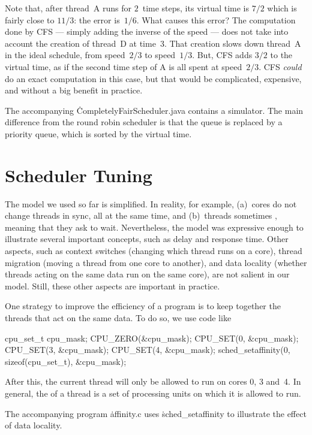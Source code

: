 Note that, after thread~A runs for $2$~time steps,
  its virtual time is $7/2$ which is fairly close to $11/3$:
  the error is~$1/6$.
What causes this error?
The computation done by CFS --- simply adding the inverse of the speed ---
  does not take into account the creation of thread~D at time~$3$.
That creation slows down thread~A in the ideal schedule,
  from speed~$2/3$ to speed~$1/3$.
But, CFS adds $3/2$ to the virtual time,
  as if the second time step of A is all spent at speed~$2/3$.
CFS \emph{could} do an exact computation in this case,
  but that would be complicated, expensive, and without a big benefit in practice.

The accompanying \.{CompletelyFairScheduler.java} contains a simulator.
The main difference from the round robin scheduler
  is that the queue is replaced by a priority queue,
  which is sorted by the virtual time.

\section{Scheduler Tuning}

The model we used so far is simplified.
In reality, for example,
  (a)~cores do not change threads in sync, all at the same time, and
  (b)~threads sometimes , meaning that they ask to wait.
Nevertheless,
  the model was expressive enough to illustrate several important concepts,
  such as delay and response time.
Other aspects,
  such as
    context switches (changing which thread runs on a core),
    thread migration (moving a thread from one core to another), and
    data locality (whether threads acting on the same data run on the same core),
  are not salient in our model.
Still, these other aspects are important in practice.

One strategy to improve the efficiency of a program
  is to keep together the threads that act on the same data.
To do so, we use code like
\begin{ccode}
cpu_set_t cpu_mask;
CPU_ZERO(&cpu_mask);
CPU_SET(0, &cpu_mask); CPU_SET(3, &cpu_mask); CPU_SET(4, &cpu_mask);
sched_setaffinity(0, sizeof(cpu_set_t), &cpu_mask);
\end{ccode}
After this, the current thread will only be allowed to run on cores 0, 3 and~4.
In general,
  the  of a thread
  is a set of processing units on which it is allowed to run.

The accompanying program \.{affinity.c} uses \.{sched\_setaffinity}
  to illustrate the effect of data locality.



